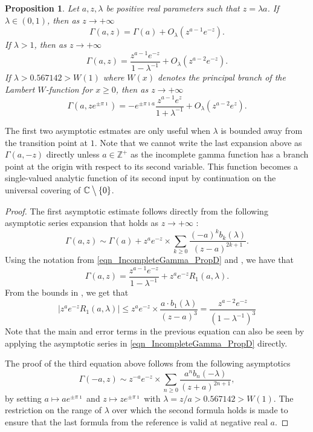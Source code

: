 \documentclass[11pt,reqno,a4letter]{article}
\numberwithin{figure}{section}
\numberwithin{table}{section}
\theoremstyle{plain}
\newtheorem{prop}[theorem]{Proposition}
\numberwithin{theorem}{section}
\theoremstyle{definition}
\begin{document}
\begin{prop}
\label{prop_IncGammaLambdaTypeBounds_v1}
Let $a,z,\lambda$ be positive real parameters such that $z=\lambda a$. 
If $\lambda \in (0, 1)$, then as $z \rightarrow +\infty$ 
\[
\Gamma(a, z) = \Gamma(a) + O_{\lambda}\left(z^{a-1} e^{-z}\right). 
\]
If $\lambda > 1$, then as 
$z \rightarrow +\infty$ 
\[
\Gamma(a, z) = \frac{z^{a-1} e^{-z}}{1-\lambda^{-1}} + O_{\lambda}\left(z^{a-2} e^{-z}\right). 
\]
If $\lambda > 0.567142 > W(1)$ where $W(x)$ denotes the principal branch of the 
Lambert $W$-function for $x \geq 0$, 
then as $z \rightarrow +\infty$ 
\[
\Gamma(a, z e^{\pm\pi\imath}) = -e^{\pm \pi\imath a} \frac{z^{a-1} e^{z}}{1 + \lambda^{-1}} + 
     O_{\lambda}\left(z^{a-2} e^{z}\right). 
\]
\end{prop}
The first two asymptotic estmates are only useful when $\lambda$ is bounded away from the 
transition point at $1$. 
Note that we cannot write the last expansion above 
as $\Gamma(a, -z)$ directly unless $a \in \mathbb{Z}^{+}$ 
as the incomplete gamma function 
has a branch point at the origin with respect to its second variable. 
This function becomes a single-valued 
analytic function of its second input by continuation 
on the universal covering of $\mathbb{C} \mathbin{\big\backslash} \{0\}$. 
\begin{proof}
The first asymptotic estimate follows directly from the following 
asymptotic series expansion that holds as $z \rightarrow +\infty$ 
\cite[Eq.\ (2.1)]{NEMES2019}: 
\[
\Gamma(a, z) \sim \Gamma(a) + z^a e^{-z} \times \sum_{k \geq 0} 
     \frac{(-a)^k b_k(\lambda)}{(z-a)^{2k+1}}. 
\]
Using the notation from \eqref{eqn_IncompleteGamma_PropD} and \cite{NEMES2016}, 
we have that 
\[
\Gamma(a, z) = \frac{z^{a-1} e^{-z}}{1-\lambda^{-1}} + z^{a} e^{-z} R_1(a, \lambda). 
\]
From the bounds in \cite[\S 3.1]{NEMES2016}, we get that 
\[
\left\lvert z^{a} e^{-z} R_1(a, \lambda) \right\rvert \leq 
     z^a e^{-z} \times \frac{a \cdot b_1(\lambda)}{(z-a)^{3}} = 
     \frac{z^{a-2} e^{-z}}{(1-\lambda^{-1})^{3}}
\]
Note that the main and error terms in the previous equation can also be 
seen by applying the asymptotic series in 
\eqref{eqn_IncompleteGamma_PropD} directly. 

The proof of the third equation above follows from the following asymptotics 
\cite[Eq.\ (1.1)]{NEMES2015C}
\[
\Gamma(-a, z) \sim z^{-a} e^{-z} \times \sum_{n \geq 0} \frac{a^n b_n(-\lambda)}{(z+a)^{2n+1}}, 
\]
by setting $a \mapsto a e^{\pm \pi\imath}$ and $z \mapsto z e^{\pm \pi\imath}$ with 
$\lambda = z/a > 0.567142 > W(1)$. 
The restriction on the range of $\lambda$ over which the second formula holds is made to ensure that 
the last formula from the reference is valid at negative real $a$. 
\end{proof}
\end{document}
